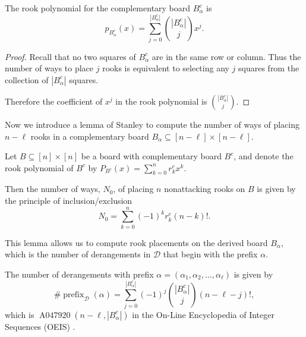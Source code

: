 \begin{lemma}
  The rook polynomial for the complementary board $B_\alpha^c$ is \begin{equation}
    p_{B_\alpha^c}(x) = \sum_{j = 0}^{|B_\alpha^c|} \binom{|B_\alpha^c|}{j}x^j.
  \end{equation}
\end{lemma}
\begin{proof}
  Recall that no two squares of $B^c_\alpha$ are in the same row or column.
  Thus the number of ways to place $j$ rooks is equivalent to selecting any
  $j$ squares from the collection of $|B^c_\alpha|$ squares.

  Therefore the coefficient of $x^j$ in the rook polynomial is
  $\binom{|B_\alpha^c|}{j}$.
\end{proof}

Now we introduce a lemma of Stanley \cite{Stanley2011EC1} to compute the number
of ways of placing $n - \ell$ rooks in a complementary board
$B_\alpha \subseteq [n - \ell] \times [n - \ell]$.

\begin{lemma}
  Let $B \subseteq [n] \times [n]$ be a board with complementary board $B^c$,
  and denote the rook polynomial of $B^c$ by
  $P_{B^c}(x) = \sum_{k=0}^n r^c_k x^k$.

  Then the number of ways, $N_0$, of placing $n$ nonattacking rooks on $B$
  is given by the principle of inclusion/exclusion
  \begin{equation}
    N_0 = \sum_{k=0}^n (-1)^k r^c_k (n-k)!.
  \end{equation}
  \label{lemma:CountsFromComplementaryPolynomials}
\end{lemma}

This lemma allows us to compute rook placements on the derived board $B_\alpha$,
which is the number of derangements in $\mathcal{D}$ that begin with the prefix
$\alpha$.
\begin{corollary}
  The number of derangements with prefix
  $\alpha = (\alpha_1, \alpha_2, \dots, \alpha_\ell)$
  is given by \begin{equation}
    \#\operatorname{prefix}_\mathcal{D}(\alpha)
    = \sum_{j=0}^{|B_\alpha^c|} (-1)^j \binom{|B_\alpha^c|}{j}(n-\ell-j)!,
  \end{equation} which is $\operatorname{A047920}(n-\ell, |B_\alpha^c|)$ in
  the On-Line Encyclopedia of Integer Sequences (OEIS) \cite{oeis}.
\label{cor:derangementsWithPrefix}
\end{corollary}


